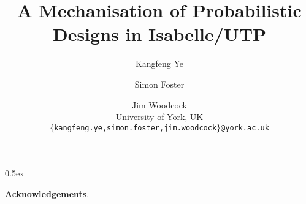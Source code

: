 \documentclass[11pt,a4paper]{article}
\begin{document}
\title{A Mechanisation of Probabilistic Designs in Isabelle/UTP}

\author{Kangfeng Ye \and Simon Foster \and Jim Woodcock \\[.5ex] University of York, UK \\[2ex] \texttt{\small $\{$kangfeng.ye,simon.foster,jim.woodcock$\}$@york.ac.uk}}

\maketitle

\begin{abstract}
     
\end{abstract}

\tableofcontents

\parindent 0pt\parskip 0.5ex

%
%
%
%
%
%
%
%
%
%
%
%

\vspace{4ex}
\noindent\textbf{Acknowledgements}. 

\appendix





\vspace{4ex}

\pagebreak 


\end{document}
